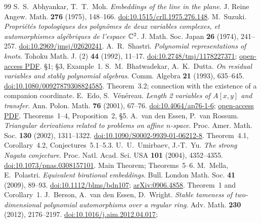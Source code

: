 \begin{thebibliography}{99}
\small\setlength{\itemsep}{6pt}
S.~S.~Abhyankar, T.~T.~Moh. \emph{Embeddings of the line in the plane}.
J. Reine Angew. Math. \textbf{276} (1975), 148--166.
\href{https://doi.org/10.1515/crll.1975.276.148}{doi:10.1515/crll.1975.276.148}.
M.~Suzuki. \emph{Propriétés topologiques des polynômes de deux variables
complexes, et automorphismes algébriques de l'espace ${\mathbb C}^2$}.
J. Math. Soc. Japan \textbf{26} (1974), 241--257.
\href{https://doi.org/10.2969/jmsj/02620241}{doi:10.2969/jmsj/02620241}.
A.~R.~Shastri. \emph{Polynomial representations of knots}.
Tohoku Math. J. (2) \textbf{44} (1992), 11--17.
\href{https://doi.org/10.2748/tmj/1178227371}{doi:10.2748/tmj/1178227371};
\href{https://www.jstage.jst.go.jp/article/tmj1949/44/1/44_1_11/_pdf}{open-access PDF}.
\S1; \S3, Example~1.
S.~M.~Bhatwadekar, A.~K.~Dutta. \emph{On residual variables and stably
polynomial algebras}. Comm. Algebra \textbf{21} (1993), 635--645.
\href{https://doi.org/10.1080/00927879308824585}{doi:10.1080/00927879308824585}.
Theorem~3.2; connection with the existence of a companion coordinate.
E.~Edo, S.~Vénéreau. \emph{Length 2 variables of $A[x,y]$ and transfer}.
Ann. Polon. Math. \textbf{76} (2001), 67--76.
\href{https://doi.org/10.4064/ap76-1-6}{doi:10.4064/ap76-1-6};
\href{https://www.impan.pl/shop/publication/transaction/download/product/85204}{open-access PDF}.
Theorems~1--4, Proposition~2, \S5.
A.~van den Essen, P.~van Rossum. \emph{Triangular derivations related
to problems on affine $n$-space}. Proc. Amer. Math. Soc.
\textbf{130} (2002), 1311--1322.
\href{https://doi.org/10.1090/S0002-9939-01-06212-8}{doi:10.1090/S0002-9939-01-06212-8}.
Theorem~4.1, Corollary~4.2, Conjectures~5.1--5.3.
U.~U.~Umirbaev, J.-T.~Yu. \emph{The strong Nagata conjecture}.
Proc. Natl. Acad. Sci. USA \textbf{101} (2004), 4352--4355.
\href{https://doi.org/10.1073/pnas.0308157101}{doi:10.1073/pnas.0308157101}.
Main Theorem; Theorems~5--6.
M.~Mella, E.~Polastri. \emph{Equivalent birational embeddings}.
Bull. London Math. Soc. \textbf{41} (2009), 89--93.
\href{https://doi.org/10.1112/blms/bdn107}{doi:10.1112/blms/bdn107};
\href{https://arxiv.org/abs/0906.4858}{arXiv:0906.4858}.
Theorem~1 and Corollary~1.
J.~Berson, A.~van den Essen, D.~Wright.
\emph{Stable tameness of two-dimensional polynomial automorphisms over a regular ring}.
Adv. Math. \textbf{230} (2012), 2176--2197.
\href{https://doi.org/10.1016/j.aim.2012.04.017}{doi:10.1016/j.aim.2012.04.017};

\end{thebibliography}
